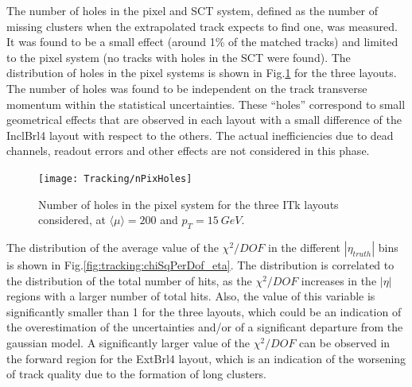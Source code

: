 \documentclass[a4paper,twoside,12pt]{book}
\begin{document}
\begin{table} [h]
\centering
	\caption{Average number of pixel, SCT and total hits in the three ITk layouts considered.}
	\label{tab:tracking:nHits}
\end{table}
 
The number of holes in the pixel and SCT system, defined as the number of missing clusters when the extrapolated track expects to find one, was measured. It was found to be
a small effect (around 1\% of the matched tracks) and limited to the pixel system (no tracks with holes in the SCT were found). The distribution of holes in the pixel systems is shown in \mbox{Fig.\ref{fig:tracking:nHoles}} for the three 
layouts. The number of holes was found to be independent on the track transverse momentum within the statistical uncertainties. 
These ``holes'' correspond to small geometrical effects that are observed in each layout with a small difference of the InclBrl4 layout with respect to the others. The actual inefficiencies due to dead channels, readout errors and other effects are not considered in this phase.\\

\begin{figure}
\centering
\texttt{[image: Tracking/nPixHoles]}
\caption{Number of holes in the pixel system for the three ITk layouts considered, at $\langle\mu\rangle = 200$ and $p_{T} = 15\ GeV$.}
\label{fig:tracking:nHoles}
\end{figure}

The distribution of the average value of the $\chi^{2}/DOF$ in the different $|\eta_{truth}|$ bins is shown in Fig.\ref{fig:tracking:chiSqPerDof_eta}. The distribution 
is correlated to the distribution of the total number of hits, as the $\chi^{2}/DOF$ increases in the $|\eta|$ regions with a larger number of total hits. Also, the value of this variable
is significantly smaller than 1 for the three layouts, which could be an indication of the overestimation of the uncertainties and/or of a significant departure from the gaussian model. A significantly larger value of the $\chi^{2}/DOF$ can be observed in the forward region for the ExtBrl4 layout, which is an indication of the worsening of track quality
due to the formation of long clusters.\\
\end{document}

